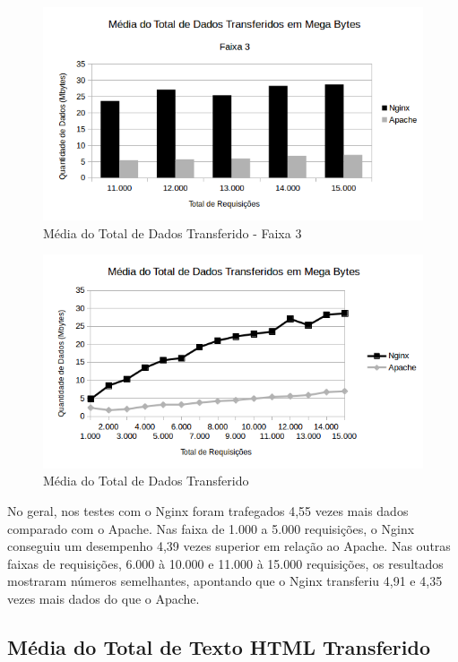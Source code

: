 \begin{figure}[H]
	\centering
	\includegraphics[width=1\linewidth]{graficos/grafico2-f3} 
	\caption{Média do Total de Dados Transferido - Faixa 3}
	\label{fig:grafico2-f3}
\end{figure}

\begin{figure}[H]
	\centering
	\includegraphics[width=1\linewidth]{graficos/grafico2} 
	\caption{Média do Total de Dados Transferido}
	\label{fig:grafico2}
\end{figure}

No geral, nos testes com o Nginx foram trafegados 4,55 vezes mais dados 
comparado com o Apache. Nas faixa de 1.000 a 5.000 requisições, o Nginx 
conseguiu um desempenho 4,39 vezes superior em relação ao Apache. Nas outras 
faixas de requisições, 6.000 à 10.000 e 11.000 à 15.000 requisições, os 
resultados mostraram números semelhantes, apontando que o Nginx transferiu 4,91 
e 4,35 vezes mais dados do que o Apache.

\subsection{Média do Total de Texto HTML Transferido}

